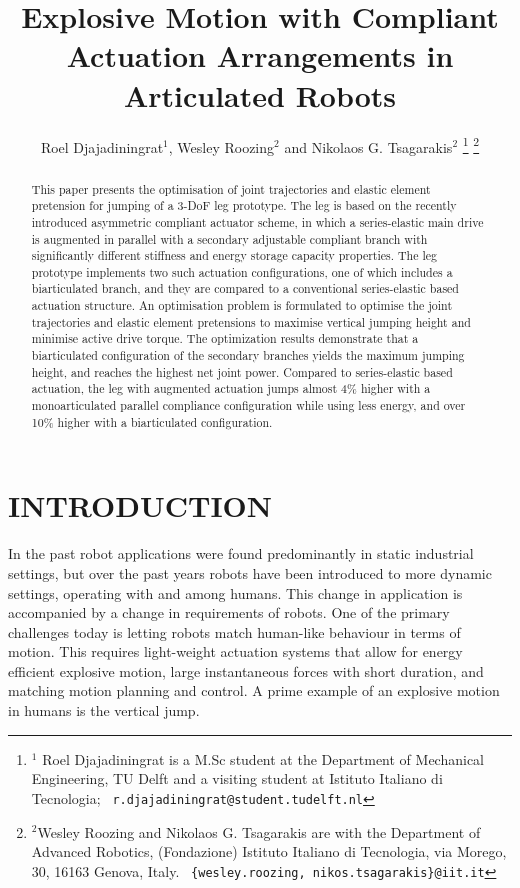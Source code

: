 \documentclass[letterpaper, 10 pt, conference]{ieeeconf}  %
\title{\LARGE \bf
	Explosive Motion with Compliant Actuation Arrangements in Articulated Robots
}
\author{Roel Djajadiningrat$^{1}$, Wesley Roozing$^{2}$ and Nikolaos G. Tsagarakis$^{2}$%
	\thanks{$^{1}$ Roel Djajadiningrat is a M.Sc student at the Department of Mechanical Engineering, TU Delft and a visiting student at Istituto Italiano di Tecnologia;
		{\tt\ r.djajadiningrat@student.tudelft.nl}
	}%
	\thanks{$^{2}$Wesley Roozing and Nikolaos G. Tsagarakis are with the Department of Advanced Robotics,
		(Fondazione) Istituto Italiano di Tecnologia, via Morego,
		30, 16163 Genova, Italy.
		{\tt\ \{wesley.roozing, nikos.tsagarakis\}@iit.it}
	}%
}
\begin{document}
	
	
	
	\maketitle
	\thispagestyle{empty}
	\pagestyle{empty}
	
	
	\begin{abstract}
		
		This paper presents the optimisation of joint trajectories and elastic element pretension for jumping of a 3-DoF leg prototype. The leg is based on the recently introduced asymmetric compliant actuator scheme, in which a series-elastic main drive is augmented in parallel with a secondary adjustable compliant branch with significantly different stiffness and energy storage capacity properties. The leg prototype implements two such actuation configurations, one of which includes a biarticulated branch, and they are compared to a conventional series-elastic based actuation structure. An optimisation problem is formulated to optimise the joint trajectories and elastic element pretensions to maximise vertical jumping height and minimise active drive torque. The optimization results demonstrate that a biarticulated configuration of the secondary branches yields the maximum jumping height, and reaches the highest net joint power. Compared to series-elastic based actuation, the leg with augmented actuation jumps almost 4\% higher with a monoarticulated parallel compliance configuration while using less energy, and over 10\% higher with a biarticulated configuration.
		
	\end{abstract}
	
	
	\section{INTRODUCTION}
	
	In the past robot applications were found predominantly in static industrial settings, but over the past years robots have been introduced to more dynamic settings, operating with and among humans. This change in application is accompanied by a change in requirements of robots. One of the primary challenges today is letting robots match human-like behaviour in terms of motion. This requires light-weight actuation systems that allow for energy efficient explosive motion, large instantaneous forces with short duration, and matching motion planning and control. A prime example of an explosive motion in humans is the vertical jump.
	
\end{document}

